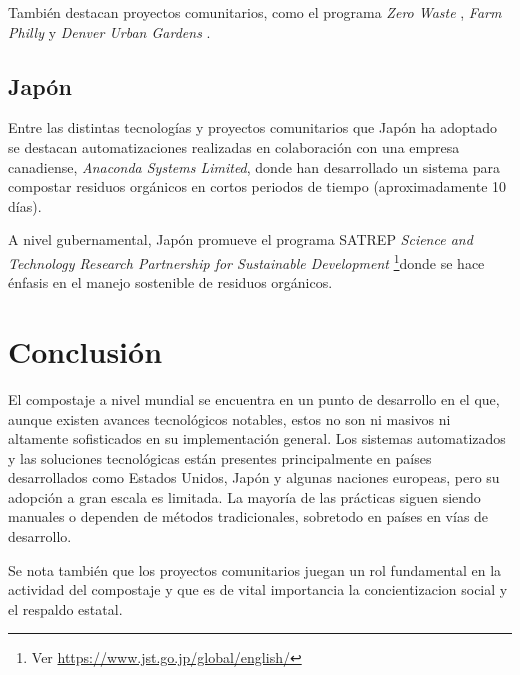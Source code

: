 También destacan proyectos comunitarios, como el programa \textit{Zero Waste} \citep{ZeroWaste}, \textit{Farm Philly} \citep{FarmPhilly} y \textit{Denver Urban Gardens} \citep{DenverUrban}.

\subsection{Japón}
Entre las distintas tecnologías y proyectos comunitarios que Japón ha adoptado se destacan automatizaciones realizadas en colaboración con una empresa canadiense, \textit{Anaconda Systems Limited}\citep{Anaconda}, donde han desarrollado un sistema para compostar residuos orgánicos en cortos periodos de tiempo (aproximadamente 10 días).

A nivel gubernamental, Japón promueve el programa SATREP \textit{Science and Technology Research Partnership for Sustainable Development} \footnote{Ver \url{https://www.jst.go.jp/global/english/}}donde se hace énfasis en el manejo sostenible de residuos orgánicos.

\section{Conclusión}
El compostaje a nivel mundial se encuentra en un punto de desarrollo en el que, aunque existen avances tecnológicos notables, estos no son ni masivos ni altamente sofisticados en su implementación general. Los sistemas automatizados y las soluciones tecnológicas están presentes principalmente en países desarrollados como Estados Unidos, Japón y algunas naciones europeas, pero su adopción a gran escala es limitada. La mayoría de las prácticas siguen siendo manuales o dependen de métodos tradicionales, sobretodo en países en vías de desarrollo.

Se nota también que los proyectos comunitarios juegan un rol fundamental en la actividad del compostaje y que es de vital importancia la concientizacion social y el respaldo estatal.



